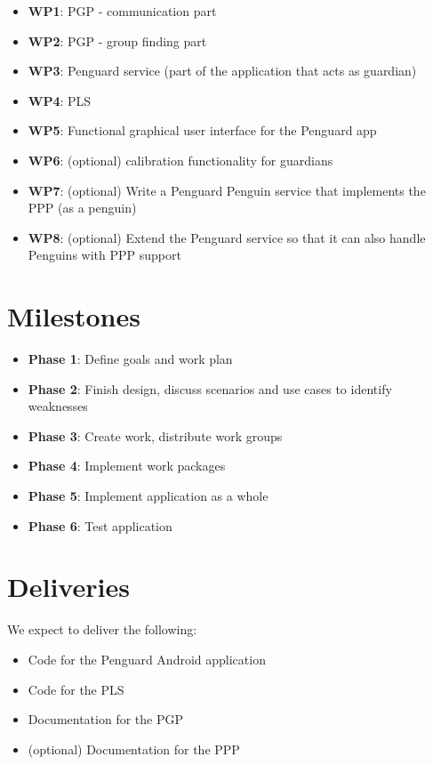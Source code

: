 \documentclass{report}
\begin{document}
\begin{itemize}
        \item {\bf WP1}: PGP - communication part
        \item {\bf WP2}: PGP - group finding part
        \item {\bf WP3}: Penguard service (part of the application that acts as guardian)
        \item {\bf WP4}: PLS
        \item {\bf WP5}: Functional graphical user interface for the Penguard app
        \item {\bf WP6}: (optional) calibration functionality for guardians
        \item {\bf WP7}: (optional) Write a Penguard Penguin service that implements the PPP (as a penguin)
        \item {\bf WP8}: (optional) Extend the Penguard service so that it can also handle Penguins with PPP support
\end{itemize}
 

\section{Milestones}

\begin{itemize}
    \item \textbf{Phase 1}: Define goals and work plan
    \item \textbf{Phase 2}: Finish design, discuss scenarios and use cases to identify weaknesses
    \item \textbf{Phase 3}: Create work, distribute work groups
    \item \textbf{Phase 4}: Implement work packages
    \item \textbf{Phase 5}: Implement application as a whole
    \item \textbf{Phase 6}: Test application
\end{itemize}




\section{Deliveries}

We expect to deliver the following:

\begin{itemize}
    \item Code for the Penguard Android application
    \item Code for the PLS
    \item Documentation for the PGP
    \item (optional) Documentation for the PPP
\end{itemize}
\end{document}
